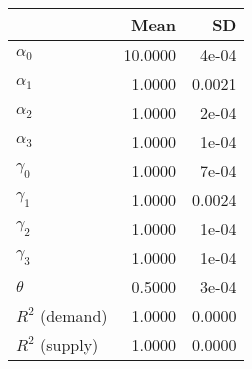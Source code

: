 
\begin{tabular}[t]{lrr}
\toprule
  & Mean & SD\\
\midrule
$\alpha_{0}$ & 10.0000 & 4e-04\\
$\alpha_{1}$ & 1.0000 & 0.0021\\
$\alpha_{2}$ & 1.0000 & 2e-04\\
$\alpha_{3}$ & 1.0000 & 1e-04\\
$\gamma_{0}$ & 1.0000 & 7e-04\\
$\gamma_{1}$ & 1.0000 & 0.0024\\
$\gamma_{2}$ & 1.0000 & 1e-04\\
$\gamma_{3}$ & 1.0000 & 1e-04\\
$\theta$ & 0.5000 & 3e-04\\
$R^{2}$ (demand) & 1.0000 & 0.0000\\
$R^{2}$ (supply) & 1.0000 & 0.0000\\
\bottomrule
\end{tabular}
